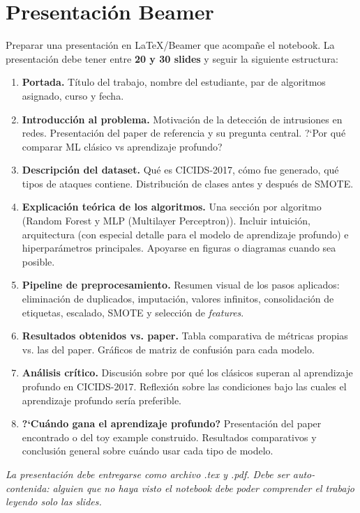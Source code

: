 \documentclass[11pt,a4paper]{article}
\begin{document}
\section{Presentaci\'on Beamer}
Preparar una presentaci\'on en LaTeX/Beamer que acompa\~ne el notebook. La presentaci\'on debe tener entre \textbf{20 y 30 slides} y seguir la siguiente estructura:
\begin{enumerate}[leftmargin=2em,itemsep=3pt]
    \item \textbf{Portada.} T\'itulo del trabajo, nombre del estudiante, par de algoritmos asignado, curso y fecha.
    \item \textbf{Introducci\'on al problema.} Motivaci\'on de la detecci\'on de intrusiones en redes. Presentaci\'on del paper de referencia y su pregunta central. ?`Por qu\'e comparar ML cl\'asico vs aprendizaje profundo?
    \item \textbf{Descripci\'on del dataset.} Qu\'e es CICIDS-2017, c\'omo fue generado, qu\'e tipos de ataques contiene. Distribuci\'on de clases antes y despu\'es de SMOTE.
    \item \textbf{Explicaci\'on te\'orica de los algoritmos.} Una secci\'on por algoritmo (Random Forest y MLP (Multilayer Perceptron)). Incluir intuici\'on, arquitectura (con especial detalle para el modelo de aprendizaje profundo) e hiperpar\'ametros principales. Apoyarse en figuras o diagramas cuando sea posible.
    \item \textbf{Pipeline de preprocesamiento.} Resumen visual de los pasos aplicados: eliminaci\'on de duplicados, imputaci\'on, valores infinitos, consolidaci\'on de etiquetas, escalado, SMOTE y selecci\'on de \textit{features}.
    \item \textbf{Resultados obtenidos vs. paper.} Tabla comparativa de m\'etricas propias vs. las del paper. Gr\'aficos de matriz de confusi\'on para cada modelo.
    \item \textbf{An\'alisis cr\'itico.} Discusi\'on sobre por qu\'e los cl\'asicos superan al aprendizaje profundo en CICIDS-2017. Reflexi\'on sobre las condiciones bajo las cuales el aprendizaje profundo ser\'ia preferible.
    \item \textbf{?`Cu\'ando gana el aprendizaje profundo?} Presentaci\'on del paper encontrado o del toy example construido. Resultados comparativos y conclusi\'on general sobre cu\'ando usar cada tipo de modelo.
\end{enumerate}
\textit{La presentaci\'on debe entregarse como archivo .tex y .pdf. Debe ser auto-contenida: alguien que no haya visto el notebook debe poder comprender el trabajo leyendo solo las slides.}
\end{document}
